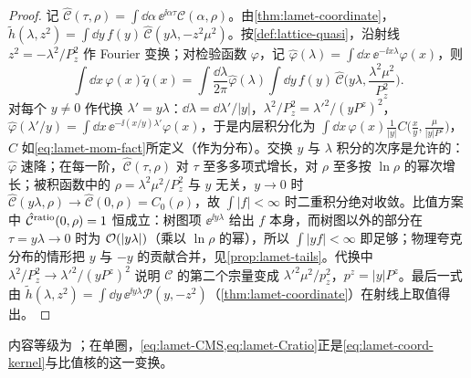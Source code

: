 \begin{proof}
记 $\hat{\mathcal C}(\tau,\rho)=\int\dd\alpha\,\ee^{\ii\alpha\tau}\mathcal C(\alpha,\rho)$。由\cref{thm:lamet-coordinate}，$\tilde h(\lambda,z^2)=\int\dd y\,f(y)\,\hat{\mathcal C}(y\lambda,-z^2\mu^2)$。按\cref{def:lattice-quasi}，沿射线 $z^2=-\lambda^2/P_z^2$ 作 Fourier 变换；对检验函数 $\varphi$，记 $\hat\varphi(\lambda)=\int\dd x\,\ee^{-\ii x\lambda}\varphi(x)$，则
\[
\int\dd x\,\varphi(x)\tilde q(x)=\int\frac{\dd\lambda}{2\pi}\hat\varphi(\lambda)\int\dd y\,f(y)\,\hat{\mathcal C}\Big(y\lambda,\frac{\lambda^2\mu^2}{P_z^2}\Big).
\]
对每个 $y\neq0$ 作代换 $\lambda'=y\lambda$：$\dd\lambda=\dd\lambda'/|y|$，$\lambda^2/P_z^2=\lambda'^2/(yP^z)^2$，$\hat\varphi(\lambda'/y)=\int\dd x\,\ee^{-\ii(x/y)\lambda'}\varphi(x)$，于是内层积分化为 $\int\dd x\,\varphi(x)\frac1{|y|}C\big(\frac xy,\frac\mu{|y|P^z}\big)$，$C$ 如\cref{eq:lamet-mom-fact}所定义（作为分布）。交换 $y$ 与 $\lambda$ 积分的次序是允许的：$\hat\varphi$ 速降；在每一阶，$\hat{\mathcal C}(\tau,\rho)$ 对 $\tau$ 至多多项式增长，对 $\rho$ 至多按 $\ln\rho$ 的幂次增长；被积函数中的 $\rho=\lambda^2\mu^2/P_z^2$ 与 $y$ 无关，$y\to0$ 时 $\hat{\mathcal C}(y\lambda,\rho)\to\hat{\mathcal C}(0,\rho)=C_0(\rho)$，故 $\int|f|<\infty$ 时二重积分绝对收敛。比值方案中 $\hat{\mathcal C}^{\rm ratio}(0,\rho)=1$ 恒成立：树图项 $\ee^{\ii y\lambda}$ 给出 $f$ 本身，而树图以外的部分在 $\tau=y\lambda\to0$ 时为 $\mathcal{O}\!\left(|y\lambda|\right)$（乘以 $\ln\rho$ 的幂），所以 $\int|yf|<\infty$ 即足够；物理夸克分布的情形把 $y$ 与 $-y$ 的贡献合并，见\cref{prop:lamet-tails}。代换中 $\lambda^2/P_z^2\to\lambda'^2/(yP^z)^2$ 说明 $\mathcal C$ 的第二个宗量变成 $\lambda'^2\mu^2/p_z^2$，$p^z=|y|P^z$。最后一式由 $\tilde h(\lambda,z^2)=\int\dd y\,\ee^{\ii y\lambda}\mathcal P(y,-z^2)$（\cref{thm:lamet-coordinate}）在射线上取值得出。
\end{proof}

内容等级为 \tagA；在单圈，\cref{eq:lamet-CMS,eq:lamet-Cratio}正是\cref{eq:lamet-coord-kernel}与比值核的这一变换。

